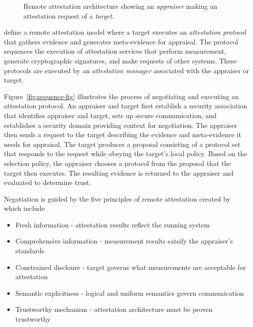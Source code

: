 \documentclass[sigconf,authordraft]{acmart}
\begin{document}
\begin{figure}[hbtp]
  \centering 
  \caption[Attestation architecture]{Remote attestation architecture
    showing an \emph{appraiser} making an attestation request of a
    \emph{target}.}
  \label{fig:architecture-fig}
\end{figure}

\citet{Coker::Principles-of-R,Coker:08:Attestation:-Ev} define a
remote attestation model where a target executes an \emph{attestation
  protocol} that gathers evidence and generates meta-evidence for
appraisal.  The protocol sequences the execution of attestation
services that perform measurement, generate cryptographic signatures,
and make requests of other systems. These protocols are executed by an
\emph{attestation manager} associated with the appraiser or target.

Figure~\ref{fig:sequence-fig} illustrates the process of negotiating
and executing an attestation protocol.  An appraiser and target first
establish a security association that identifies appraiser and target,
sets up secure communication, and establishes a security domain
providing context for negotiation.  The appraiser then sends a request
to the target describing the evidence and meta-evidence it needs for
appraisal.  The target produces a proposal consisting of a protocol
set that responds to the request while obeying the target's local
policy. Based on the selection policy, the appraiser chooses a
protocol from the proposal that the target then executes.  The
resulting evidence is returned to the appraiser and evaluated to
determine trust.

Negotiation is guided by the five principles of remote attestation
created by \citet{Coker::Principles-of-R,Coker:08:Attestation:-Ev}
which include

\begin{itemize}
\item Fresh information - attestation results reflect the running
  system
\item Comprehensive information - measurement results satsify the
  appraiser's standards
\item Constrained discloure - target governs what measurements are
  acceptable for attestation
\item Semantic explicitness - logical and uniform semantics govern
  communication
\item Trustworthy mechanism - attestation architecture must be proven
  trustworthy
\end{itemize}
\end{document}
